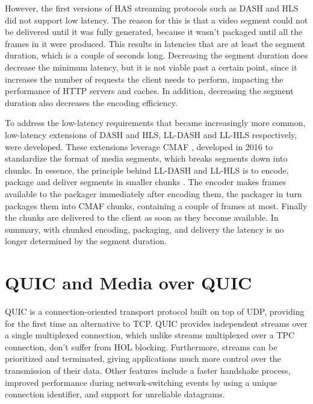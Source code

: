 However, the first versions of \ac{HAS} streaming protocols such as DASH and HLS did not support low latency. The reason for this is that a video segment could not be delivered until it was fully generated, because it wasn't packaged until all the frames in it were produced. This results in latencies that are at least the segment duration, which is a couple of seconds long. Decreasing the segment duration does decrease the minimum latency, but it is not viable past a certain point, since it increases the number of requests the client needs to perform, impacting the performance of HTTP servers and caches. In addition, decreasing the segment duration also decreases the encoding efficiency.

To address the low-latency requirements that became increasingly more common, low-latency extensions of \ac{DASH} and \ac{HLS}, LL-DASH and LL-HLS respectively, were developed. These extensions leverage \ac{CMAF} \parencite{14:00-17:00ISOIEC2300019}, developed in 2016 to standardize the format of media segments, which breaks segments down into chunks. In essence, the principle behind LL-DASH and LL-HLS is to encode, package and deliver segments in smaller chunks \parencite{bentalebOneSecondLatencyEvolution2023, durakEvaluatingPerformanceApple2020}. The encoder makes frames available to the packager immediately after encoding them, the packager in turn packages them into CMAF chunks, containing a couple of frames at most. Finally the chunks are delivered to the client as soon as they become available. In summary, with chunked encoding, packaging, and delivery the latency is no longer determined by the segment duration.

\section{QUIC and Media over QUIC}
QUIC is a connection-oriented transport protocol built on top of UDP, providing for the first time an alternative to TCP. QUIC provides independent streams over a single multiplexed connection, which unlike streams multiplexed over a TPC connection, don't suffer from \ac{HOL} blocking. Furthermore, streams can be prioritized and terminated, giving applications much more control over the transmission of their data. Other features include a faster handshake process, improved performance during network-switching events by using a unique connection identifier, and support for unreliable datagrams.

